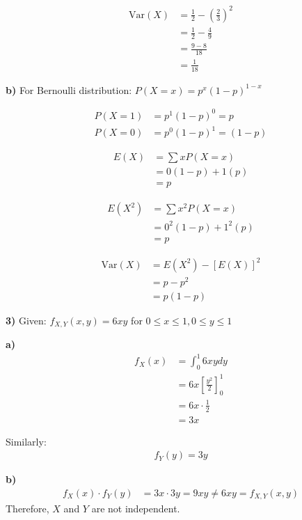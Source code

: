 \documentclass{article}
\begin{document}
\begin{align}
\text{Var}(X) &= \frac{1}{2} - \left(\frac{2}{3}\right)^2 \\
&= \frac{1}{2} - \frac{4}{9} \\
&= \frac{9-8}{18} \\
&= \frac{1}{18}
\end{align}

\textbf{b)} For Bernoulli distribution: $P(X = x) = p^x(1-p)^{1-x}$

\begin{align}
P(X = 1) &= p^1(1-p)^0 = p \\
P(X = 0) &= p^0(1-p)^1 = (1-p)
\end{align}

\begin{align}
E(X) &= \sum x P(X = x) \\
&= 0(1-p) + 1(p) \\
&= p
\end{align}

\begin{align}
E(X^2) &= \sum x^2 P(X = x) \\
&= 0^2(1-p) + 1^2(p) \\
&= p
\end{align}

\begin{align}
\text{Var}(X) &= E(X^2) - [E(X)]^2 \\
&= p - p^2 \\
&= p(1-p)
\end{align}

\newpage

\textbf{3)} Given: $f_{X,Y}(x,y) = 6xy$ for $0 \leq x \leq 1, 0 \leq y \leq 1$

\textbf{a)} 
\begin{align}
f_X(x) &= \int_0^1 6xy dy \\
&= 6x \left[\frac{y^2}{2}\right]_0^1 \\
&= 6x \cdot \frac{1}{2} \\
&= 3x
\end{align}

Similarly:
\begin{align}
f_Y(y) = 3y
\end{align}

\textbf{b)} 
\begin{align}
f_X(x) \cdot f_Y(y) &= 3x \cdot 3y = 9xy \neq 6xy = f_{X,Y}(x,y)
\end{align}
Therefore, $X$ and $Y$ are not independent.
\end{document}
